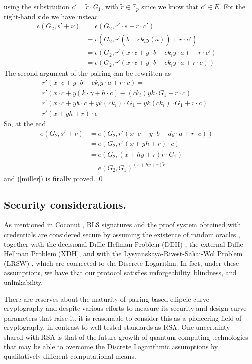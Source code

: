 \documentclass[twocolumn]{article}
\begin{document}
using the substitution $c'=\tilde{r}\cdot G_1$, with $\tilde{r}\in\mathbb{F}_p$ since we know that $c'\in E$. For the right-hand side we have instead
\begin{align*}
    e(G_2, s' + \nu) &= e(G_2, r'\cdot s + r \cdot c') \\
    &= e(G_2, r'(\tilde{b} - ck_i y (\tilde{a})) + r \cdot c') \\
    &= e(G_2, r'(x\cdot c + y\cdot b - ck_i y\cdot a) + r \cdot c') \\
    &= e(G_2, r'(x\cdot c + y\cdot b - ck_i y\cdot a + r \cdot c)) 
\end{align*}
The second argument of the pairing can be rewritten as
\[
\begin{split}
    &r'(x\cdot c + y\cdot b - ck_i y\cdot a + r \cdot c) = \\
    &r'(x\cdot c + y(k\cdot \gamma + h\cdot c) - (ck_i) yk\cdot G_1 + r \cdot c) = \\
    &r'(x\cdot c + yh\cdot c + yk(ck_i)\cdot G_1  - yk(ck_i)\cdot G_1 + r \cdot c) = \\
    &r'(x + yh + r) \cdot c
\end{split}
\]
So, at the end
\[
\begin{split}
    e(G_2, s' + \nu) &= e(G_2, r'(x\cdot c + y\cdot b - dy\cdot a + r \cdot c)) \\
    &= e(G_2, r'(x + yh + r) \cdot c) \\
    &= e(G_2,(x+hy+r)\tilde{r}\cdot G_1) \\
    &= e(G_2,G_1)^{(x+hy+r)\tilde{r}}
\end{split}
\]
and (\ref{miller}) is finally proved. 
\qed

\subsection*{Security considerations.} 

As mentioned in Coconut \citep{coconut-2018}, BLS signatures and the
proof system obtained with credentials are considered secure by assuming
the existence of random oracles \citep{random-oracle}, together with the
decisional Diffie-Hellman Problem (DDH) \citep{DDH-problem}, the
external Diffie-Hellman Problem (XDH), and with the
Lysyanskaya-Rivest-Sahai-Wol Problem (LRSW) \citep{lrsw-assumption},
which are connected to the Discrete Logarithm. In fact, under these
assumptions, we have that our protocol satisfies unforgeability,
blindness, and unlinkability.

There are reserves about the maturity of pairing-based ellipcic curve
cryptography and despite various efforts to measure its security and
design curve parameters that raise it, it is reasonable to consider this
as a pioneering field of cryptography, in contrast to well tested
standards as RSA. One uncertainty shared with RSA is that of the future
growth of quantum-computing technologies that may be able to overcome
the Discrete Logarithmic assumptions by qualitatively different
computational means.
\end{document}
